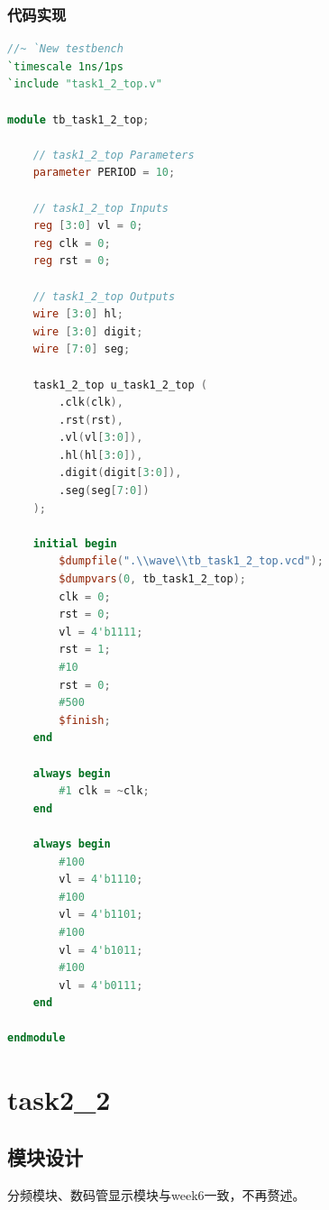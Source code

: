 \documentclass[UTF8]{ctexart}
\begin{document}
\subsubsection{代码实现}
\begin{framed}
    \begin{lstlisting}[language=verilog,style=verilogStyle]
//~ `New testbench
`timescale 1ns/1ps
`include "task1_2_top.v"

module tb_task1_2_top;

    // task1_2_top Parameters
    parameter PERIOD = 10;

    // task1_2_top Inputs
    reg [3:0] vl = 0;
    reg clk = 0;
    reg rst = 0;

    // task1_2_top Outputs
    wire [3:0] hl;
    wire [3:0] digit;
    wire [7:0] seg;

    task1_2_top u_task1_2_top (
        .clk(clk),
        .rst(rst),
        .vl(vl[3:0]),
        .hl(hl[3:0]),
        .digit(digit[3:0]),
        .seg(seg[7:0])
    );

    initial begin
        $dumpfile(".\\wave\\tb_task1_2_top.vcd");
        $dumpvars(0, tb_task1_2_top);
        clk = 0;
        rst = 0;
        vl = 4'b1111;
        rst = 1;
        #10
        rst = 0;
        #500
        $finish;
    end

    always begin
        #1 clk = ~clk;
    end

    always begin
        #100
        vl = 4'b1110;
        #100
        vl = 4'b1101;
        #100
        vl = 4'b1011;
        #100
        vl = 4'b0111;
    end

endmodule
    \end{lstlisting}
\end{framed}
\section{task2\_2}
\subsection{模块设计}
分频模块、数码管显示模块与week6一致，不再赘述。
\end{document}

